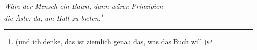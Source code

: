 \thispagestyle{empty}

\newpage

\thispagestyle{empty}
\renewcommand*\footnoterule{}
\vspace*{\fill}
\begin{center}
\textit{
Wäre der Mensch ein Baum, dann wären Prinzipien\\
die Äste: da, um Halt zu bieten.\footnote{(und ich denke, das ist ziemlich genau das, was das Buch will.)}
}
\end{center}
\vspace*{\fill}


\tableofcontents

\newpage
\thispagestyle{empty}


\newpage
\thispagestyle{empty}


\newpage
\thispagestyle{empty}


